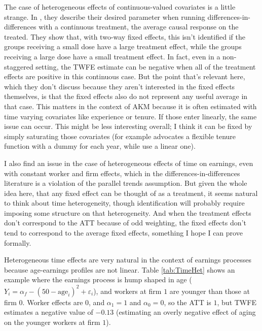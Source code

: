 \documentclass{article}
\begin{document}
The case of heterogeneous effects of continuous-valued covariates is a little strange. In \citet{callaway2021difference}, they describe their desired parameter when running differences-in-differences with a continuous treatment, the average causal response on the treated. They show that, with two-way fixed effects, this isn't identified if the groups receiving a small dose have a large treatment effect, while the groups receiving a large dose have a small treatment effect. In fact, even in a non-staggered setting, the TWFE estimate can be negative when all of the treatment effects are positive in this continuous case. But the point that's relevant here, which they don't discuss because they aren't interested in the fixed effects themselves, is that the fixed effects also do not represent any useful average in that case. %
This matters in the context of AKM because it is often estimated with time varying covariates like experience or tenure. If those enter linearly, the same issue can occur. This might be less interesting overall; I think it can be fixed by simply saturating those covariates (for example \citet{woodcock2015match} advocates a flexible tenure function with a dummy for each year, while \citet{lachowska2020sources} use a linear one).

I also find an issue in the case of heterogeneous effects of time on earnings, even with constant worker and firm effects, which in the differences-in-differences literature is a violation of the parallel trends assumption. But given the whole idea here, that any fixed effect can be thought of as a treatment, it seems natural to think about time heterogeneity, though identification will probably require imposing some structure on that heterogeneity. And when the treatment effects don't correspond to the ATT because of odd weighting, the fixed effects don't tend to correspond to the average fixed effects, something I hope I can prove formally.

Heterogeneous time effects are very natural in the context of earnings processes because age-earnings profiles are not linear. Table \ref{tab:TimeHet} shows an example where the earnings process is hump shaped in age ($Y_i = \alpha_f - (50 - \text{age}_i) ^ 2 + \varepsilon_i$), and workers at firm $1$ are younger than those at firm $0$. Worker effects are 0, and $\alpha_1 = 1$ and $\alpha_0 = 0$, so the ATT is $1$, but TWFE estimates a negative value of $-0.13$ (estimating an overly negative effect of aging on the younger workers at firm $1$).
\end{document}
